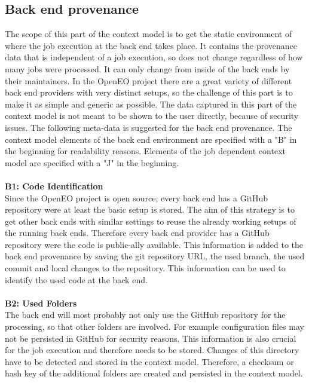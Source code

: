 \documentclass[draft,final]{vutinfth} %
\begin{document}
\subsection{Back end provenance}\label{Design:Back end provenance}
The scope of this part of the context model is to get the static environment of where the job execution at the back end takes place. It contains the provenance data that is independent of a job execution, so does not change regardless of how many jobs were processed. It can only change from inside of the back ends by their maintainers. In the OpenEO project there are a great variety of different back end providers with very distinct setups, so the challenge of this part is to make it as simple and generic as possible. The data captured in this part of the context model is not meant to be shown to the user directly, because of security issues. The following meta-data is suggested for the back end provenance. The context model elements of the back end environment are specified with a "B" in the beginning for readability reasons. Elements of the job dependent context model are specified with a "J" in the beginning. 
\\ \\
\textbf{B1: Code Identification} \\
Since the OpenEO project is open source, every back end has a GitHub repository were at least the basic setup is stored. The aim of this strategy is to get other back ends with similar settings to reuse the already working setups of the running back ends.  Therefore every back end provider has a GitHub repository were the code is public-ally available. This information is added to the back end provenance by saving the git repository URL, the used branch, the used commit and local changes to the repository. This information can be used to identify the used code at the back end.    
\\ \\
\textbf{B2: Used Folders} \\
The back end will most probably not only use the GitHub repository for the processing, so that other folders are involved. For example configuration files may not be persisted in GitHub for security reasons. This information is also crucial for the job execution and therefore needs to be stored. Changes of this directory have to be detected and stored in the context model. Therefore, a checksum or hash key of the additional folders are created and persisted in the context model.     
\\ \\
\end{document}
